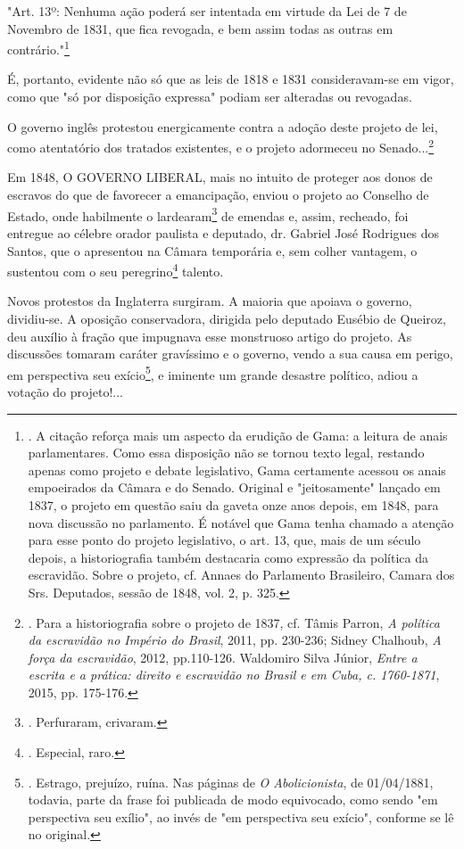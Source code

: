"Art. 13º: Nenhuma ação poderá ser intentada em virtude da Lei de 7 de
Novembro de 1831, que fica revogada, e bem assim todas as outras em
contrário."\footnote{. A citação reforça mais um aspecto da erudição de
  Gama: a leitura de anais parlamentares. Como essa disposição não se
  tornou texto legal, restando apenas como projeto e debate legislativo,
  Gama certamente acessou os anais empoeirados da Câmara e do Senado.
  Original e "jeitosamente" lançado em 1837, o projeto em questão saiu
  da gaveta onze anos depois, em 1848, para nova discussão no
  parlamento. É notável que Gama tenha chamado a atenção para esse ponto
  do projeto legislativo, o art. 13, que, mais de um século depois, a
  historiografia também destacaria como expressão da política da
  escravidão. Sobre o projeto, cf. Annaes do Parlamento Brasileiro,
  Camara dos Srs. Deputados, sessão de 1848, vol. 2, p. 325.}

É, portanto, evidente não só que as leis de 1818 e 1831 consideravam-se
em vigor, como que "só por disposição expressa" podiam ser alteradas ou
revogadas.

O governo inglês protestou energicamente contra a adoção deste projeto
de lei, como atentatório dos tratados existentes, e o projeto adormeceu
no Senado...\footnote{. Para a historiografia sobre o projeto de 1837,
  cf. Tâmis Parron, \emph{A política da escravidão no Império do
  Brasil}, 2011, pp. 230-236; Sidney Chalhoub, \emph{A força da
  escravidão}, 2012, pp.110-126. Waldomiro Silva Júnior, \emph{Entre a
  escrita e a prática: direito e escravidão no Brasil e em Cuba, c.
  1760-1871}, 2015, pp. 175-176.}

Em 1848, O GOVERNO LIBERAL, mais no intuito de proteger aos donos de
escravos do que de favorecer a emancipação, enviou o projeto ao Conselho
de Estado, onde habilmente o lardearam\footnote{. Perfuraram, crivaram.}
de emendas e, assim, recheado, foi entregue ao célebre orador paulista e
deputado, dr. Gabriel José Rodrigues dos Santos, que o apresentou na
Câmara temporária e, sem colher vantagem, o sustentou com o seu
peregrino\footnote{. Especial, raro.} talento.

Novos protestos da Inglaterra surgiram. A maioria que apoiava o governo,
dividiu-se. A oposição conservadora, dirigida pelo deputado Eusébio de
Queiroz, deu auxílio à fração que impugnava esse monstruoso artigo do
projeto. As discussões tomaram caráter gravíssimo e o governo, vendo a
sua causa em perigo, em perspectiva seu exício\footnote{. Estrago,
  prejuízo, ruína. Nas páginas de \emph{O Abolicionista}, de 01/04/1881,
  todavia, parte da frase foi publicada de modo equivocado, como sendo
  "em perspectiva seu exílio", ao invés de "em perspectiva seu exício",
  conforme se lê no original.}, e iminente um grande desastre político,
adiou a votação do projeto!...

